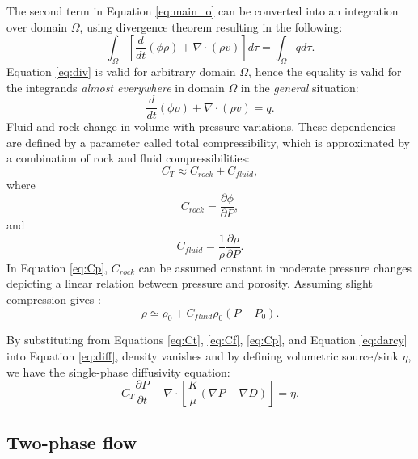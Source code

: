 The second term in Equation \ref{eq:main_o} can be converted into an integration
over domain $\Omega$, using divergence theorem resulting in the following:
\begin{equation}
  \int_{\Omega}[\frac{d}{d t}(\phi\rho)+\nabla \cdot (\rho
v)]d\tau=\int_{\Omega}qd\tau.
  \label{eq:div}
\end{equation} Equation \ref{eq:div} is valid for arbitrary domain $\Omega$,
hence the equality is valid for the integrands \textit{almost everywhere} in
domain $\Omega$ in the \textit{general} situation:
\begin{equation}
 \frac{d}{d t}(\phi\rho)+\nabla \cdot (\rho v)=q.
 \label{eq:diff}
\end{equation}
Fluid and rock change in volume with pressure variations. These dependencies are
defined by a parameter called total compressibility, which is approximated by a
combination of rock and fluid compressibilities:
\begin{equation}
  C_{T}\approx C_{rock}+C_{fluid},
  \label{eq:Ct}
\end{equation} where
\begin{equation}
  C_{rock}=\frac{\partial \phi}{\partial P},
  \label{eq:Cp}
\end{equation} and
\begin{equation}
  C_{fluid}=\frac{1}{\rho} \frac{\partial \rho}{\partial P}.
  \label{eq:Cf}
\end{equation} In Equation \ref{eq:Cp}, $C_{rock}$ can be assumed constant in
moderate pressure changes depicting a linear relation between pressure and
porosity. Assuming slight compression gives \cite{sahimi2011flow}:
\begin{equation}
 \rho \simeq \rho_0 + C_{fluid} \rho_0 (P-P_0).
 \label{eq:Cslg}
\end{equation}

By substituting from Equations \ref{eq:Ct}, \ref{eq:Cf}, \ref{eq:Cp}, and
Equation \ref{eq:darcy} into Equation \ref{eq:diff}, density vanishes and by
defining volumetric source/sink $\eta$, we have the single-phase diffusivity
equation:
\begin{equation}
 C_T \frac{\partial P}{\partial t}-\nabla \cdot [\frac{K}{\mu} (\nabla P -
\nabla D)] = \eta.
 \label{eq:vol}
\end{equation}

\subsection{Two-phase flow}

